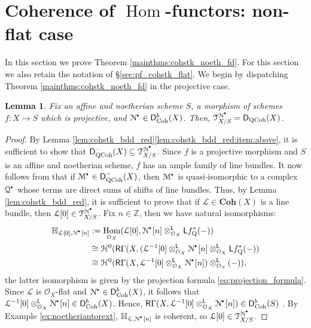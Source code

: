\documentclass{amsart}
\theoremstyle{plain}
\newtheorem{lem}[thm]{Lemma}
\theoremstyle{definition}
\theoremstyle{remark}
\numberwithin{equation}{section}
\newcommand{\itemref}[1]{\eqref{#1}}
\newcommand{\Z}{\mathbb{Z}}
\newcommand{\Orb}{\mathcal{O}}
\newcommand{\COH}[1]{\mathbf{Coh}({#1})}
\DeclareMathOperator{\Hom}{Hom}
\newcommand{\COHO}[1]{\mathcal{H}^{{#1}}}
\newcommand{\RDERF}{\mathsf{R}}
\newcommand{\LDERF}{\mathsf{L}}
\newcommand{\DCAT}{\mathsf{D}}
\newcommand{\tensor}{\otimes}
\newcommand{\shv}[1]{\mathcal{{#1}}}
\newcommand{\E}[2]{\mathbb{H}_{{#1},{#2}}}
\newcommand{\QCPBK}[1]{{#1}_{\mathrm{Q}}^*}
\newcommand{\DQCOH}{\DCAT_{\mathrm{QCoh}}}
\newcommand{\DCOH}{\DCAT_{\mathrm{Coh}}}
\newcommand{\TSUB}[2]{\mathcal{T}_{{#1}}^{{#2}}}
\newcommand{\sbt}{\,\begin{picture}(-1,-1)(0,-2)\circle*{1.5}\end{picture}\ }
\newcommand{\cplx}[1]{\shv{{#1}}^{\sbt}}
\begin{document}
\section{Coherence of $\Hom$-functors: non-flat case} 
In this section we prove Theorem
  \ref{mainthms:cohstk_noeth_fd}. For this section we also retain the notation of
\S\ref{sec:pf_cohstk_flat}. We begin by dispatching Theorem
\ref{mainthms:cohstk_noeth_fd} in the projective case.
\begin{lem}\label{lem:cohstk_proj}
  Fix an affine and noetherian scheme $S$, a morphism of schemes $f :
  X \to S$ which is projective, and $\cplx{N} \in
  \DCOH^b(X)$. Then, $\TSUB{X/S}{\cplx{N}} = \DQCOH(X)$.
\end{lem}
\begin{proof}
  By Lemma \ref{lem:cohstk_bdd_red}\itemref{lem:cohstk_bdd_red:item:above}, it is sufficient to show that
  $\DQCOH^-(X) \subseteq \TSUB{X/S}{\cplx{N}}$. Since $f$ is a
  projective morphism and $S$ is an affine and noetherian scheme, $f$
  has an ample family of line bundles. It now follows from
  \cite[II.2.2.9]{MR0354655} that if $\cplx{M} \in \DQCOH^-(X)$, then
  $\cplx{M}$ is quasi-isomorphic to a complex $\cplx{Q}$ whose terms
  are direct sums of shifts of line bundles. Thus, by Lemma
  \ref{lem:cohstk_bdd_red}, it is sufficient to prove that if
  $\shv{L} \in \COH{X}$ is a line bundle, then $\shv{L}[0] \in
  \TSUB{X/S}{\cplx{N}}$. Fix $n\in \Z$, then we have
  natural isomorphisms:
  \begin{align*}
    \E{\shv{L}[0]}{\cplx{N}[n]}&:=\Hom_{\Orb_X}(\shv{L}[0],
    \cplx{N}[n]
    \tensor_{\Orb_X}^\LDERF \LDERF \QCPBK{f}(-))\\
    &\cong \COHO{0}(\RDERF \Gamma(X,(\shv{L}^{-1}[0]
    \tensor_{\Orb_X}^\LDERF \cplx{N}[n]
    \tensor_{\Orb_X}^\LDERF \LDERF \QCPBK{f}(-))\\
    &\cong \COHO{0}(\RDERF\Gamma(X,\shv{L}^{-1}[0]
    \tensor_{\Orb_X}^\LDERF \cplx{N}[n]) \tensor_{\Orb_S}^\LDERF
    (-)),
  \end{align*}
  the latter isomorphism is given by the projection formula
  \eqref{eq:projection_formula}. Since $\shv{L}$ is $\Orb_X$-flat and 
  $\cplx{N} \in \DCOH^b(X)$, it follows that
  $\shv{L}^{-1}[0]\tensor_{\Orb_X}^\LDERF \cplx{N}[n] \in  
  \DCOH^b(X)$. Hence,  $\RDERF
  \Gamma(X,\shv{L}^{-1}[0]\tensor_{\Orb_X}^\LDERF \cplx{N}[n]) \in
  \DCOH^b(S)$ \cite[III.2.2]{MR0354655}. By Example
  \ref{ex:noetheriantorext}, $\E{\shv{L}}{\cplx{N}[n]}$ is
  coherent, so $\shv{L}[0]\in \TSUB{X/S}{\cplx{N}}$.    
\end{proof}
\end{document}
